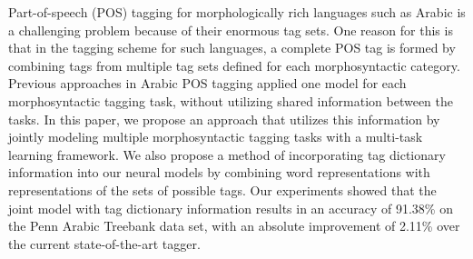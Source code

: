 Part-of-speech (POS) tagging for morphologically rich languages such as Arabic is a challenging problem because of their enormous tag sets. One reason for this is that in the tagging scheme for such languages, a complete POS tag is formed by combining tags from multiple tag sets defined for each morphosyntactic category. Previous approaches in Arabic POS tagging applied one model for each morphosyntactic tagging task, without utilizing shared information between the tasks. In this paper, we propose an approach that utilizes this information by jointly modeling multiple morphosyntactic tagging tasks with a multi-task learning framework. We also propose a method of incorporating tag dictionary information into our neural models by combining word representations with representations of the sets of possible tags. Our experiments showed that the joint model with tag dictionary information results in an accuracy of 91.38\% on the Penn Arabic Treebank data set, with an absolute improvement of 2.11\% over the current state-of-the-art tagger.
